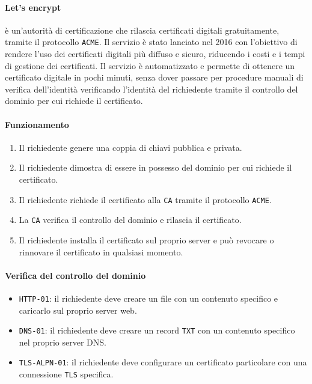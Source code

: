             \paragraph{Let's encrypt} è un'autorità di certificazione che rilascia certificati digitali gratuitamente, tramite il protocollo \texttt{ACME}. Il servizio è stato lanciato nel 2016 con l'obiettivo di rendere l'uso dei certificati digitali più diffuso e sicuro, riducendo i costi e i tempi di gestione dei certificati. Il servizio è automatizzato e permette di ottenere un certificato digitale in pochi minuti, senza dover passare per procedure manuali di verifica dell'identità verificando l'identità del richiedente tramite il controllo del dominio per cui richiede il certificato.
            \paragraph{Funzionamento}\begin{enumerate}
                \item Il richiedente genere una coppia di chiavi pubblica e privata.
                \item Il richiedente dimostra di essere in possesso del dominio per cui richiede il certificato.
                \item Il richiedente richiede il certificato alla \texttt{CA} tramite il protocollo \texttt{ACME}.
                \item La \texttt{CA} verifica il controllo del dominio e rilascia il certificato.
                \item Il richiedente installa il certificato sul proprio server e può revocare o rinnovare il certificato in qualsiasi momento.
            \end{enumerate}
            \paragraph{Verifica del controllo del dominio}\begin{itemize}
                \item \texttt{HTTP-01}: il richiedente deve creare un file con un contenuto specifico e caricarlo sul proprio server web.
                \item \texttt{DNS-01}: il richiedente deve creare un record \texttt{TXT} con un contenuto specifico nel proprio server DNS.
                \item \texttt{TLS-ALPN-01}: il richiedente deve configurare un certificato particolare con una connessione \texttt{TLS} specifica.
            \end{itemize}
